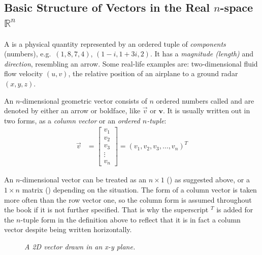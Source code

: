 \subsection{Basic Structure of Vectors in the Real $n$-space $\mathbb{R}^n$}
A  is a physical quantity represented by an ordered tuple of \textit{components} (numbers), e.g.\ $(1, 8, 7, 4)$, $(1-i, 1+3i, 2)$. It has a \textit{magnitude (length)} and \textit{direction}, resembling an arrow. Some real-life examples are: two-dimensional fluid flow velocity $(u, v)$, the relative position of an airplane to a ground radar $(x, y, z)$.
\begin{defn}
\label{defn:geometvec}
An $n$-dimensional geometric vector consists of $n$ ordered numbers called  and are denoted by either an arrow or boldface, like $\vec{v}$ or $\textbf{v}$. It is usually written out in two forms, as a \textit{column vector} or an \textit{ordered $n$-tuple}:
\begin{align}
\vec{v} &=
\begin{bmatrix}
v_1 \\
v_2 \\
v_3 \\
\vdots \\
v_n
\end{bmatrix}
=
(v_1, v_2, v_3, \ldots, v_n)^T
\end{align}
\end{defn}
An $n$-dimensional vector can be treated as an $n \times 1$ () as suggested above, or a $1 \times n$ matrix () depending on the situation. The form of a column vector is taken more often than the row vector one, so the column form is assumed throughout the book if it is not further specified. That is why the superscript $^T$ is added for the $n$-tuple form in the definition above to reflect that it is in fact a column vector despite being written horizontally. \par
\begin{figure}[ht!]
    \centering
    \caption{\textit{A 2D vector drawn in an x-y plane.}}
\end{figure}
